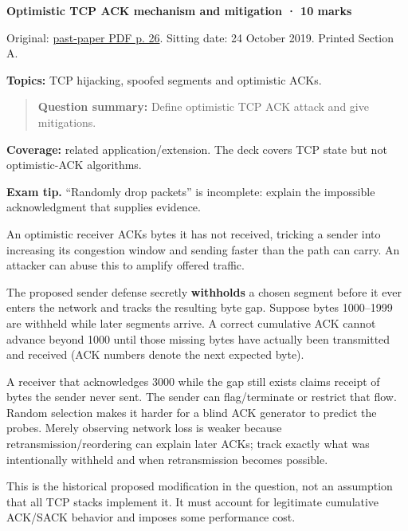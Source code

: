 \documentclass[11pt,a4paper]{article}
\begin{document}
\textbf{Optimistic TCP ACK mechanism and mitigation · 10 marks}


Original: \href{../../CSE405-Security_Merged.pdf\#page=26}{past-paper PDF p. 26}. Sitting date: 24 October 2019. Printed Section A.


\textbf{Topics:} TCP hijacking,\allowbreak{} spoofed segments and optimistic ACKs.



\begin{quote}\small

\textbf{Question summary:} Define optimistic TCP ACK attack and give mitigations.



\end{quote}

\textbf{Coverage:} related application/\allowbreak{}extension. The deck covers TCP state but not optimistic-ACK algorithms.



{\color{ForestGreen}\textbf{Exam tip.} “Randomly drop packets” is incomplete: explain the impossible acknowledgment that supplies evidence.}


An optimistic receiver ACKs bytes it has not received,\allowbreak{} tricking a sender into increasing its congestion window and sending faster than the path can carry. An attacker can abuse this to amplify offered traffic.


The proposed sender defense secretly \textbf{withholds} a chosen segment before it ever enters the network and tracks the resulting byte gap. Suppose bytes 1000–1999 are withheld while later segments arrive. A correct cumulative ACK cannot advance beyond 1000 until those missing bytes have actually been transmitted and received (ACK numbers denote the next expected byte).


A receiver that acknowledges 3000 while the gap still exists claims receipt of bytes the sender never sent. The sender can flag/\allowbreak{}terminate or restrict that flow. Random selection makes it harder for a blind ACK generator to predict the probes. Merely observing network loss is weaker because retransmission/\allowbreak{}reordering can explain later ACKs; track exactly what was intentionally withheld and when retransmission becomes possible.


This is the historical proposed modification in the question,\allowbreak{} not an assumption that all TCP stacks implement it. It must account for legitimate cumulative ACK/\allowbreak{}SACK behavior and imposes some performance cost.
\end{document}

